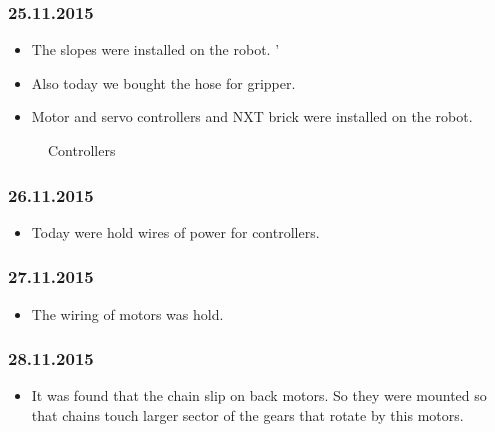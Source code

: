 \subsubsection{25.11.2015}
\begin{itemize}
\item The slopes were installed on the robot.
'\item Also today we bought the hose for gripper. 
\item Motor and servo controllers and NXT brick were installed on the robot.
\end{itemize}
\begin{figure}[H]
	\begin{minipage}[h]{1\linewidth}
		\caption{Controllers}
	\end{minipage}
\end{figure} 
\subsubsection{26.11.2015}
\begin{itemize}
\item Today were hold wires of power for controllers.
\end{itemize}
\subsubsection{27.11.2015}
\begin{itemize}
\item The wiring of motors was hold.
\end{itemize}
\subsubsection{28.11.2015}
\begin{itemize}
\item It was found that the chain slip on back motors. So they were mounted so that chains touch larger sector of the gears that rotate by this motors.
\end{itemize}
